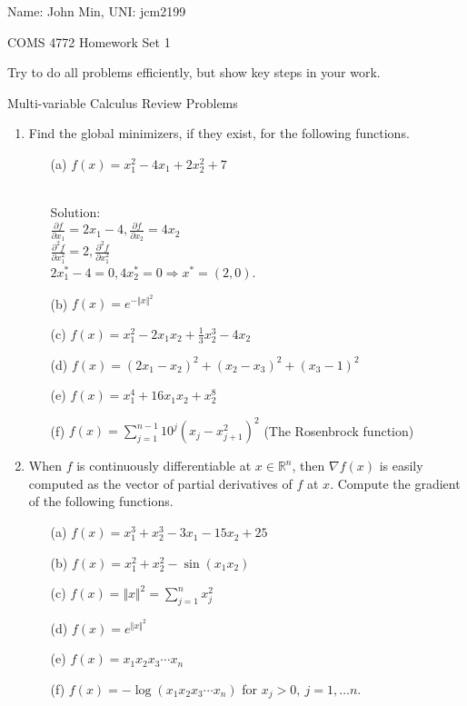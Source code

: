 \documentclass[12pt]{amsart}
\newcommand{\norm}[1]{\Vert #1 \Vert}
\newcommand{\Rn}{\R^n}
\newcommand{\R}{{\mathbb{R}}}
\newcommand{\grad}{\nabla}
\begin{document}
{\Large Name: John Min, \Large UNI: jcm2199}  \\
\begin{center}
\Large COMS 4772 \hskip 2in Homework Set 1
\end{center}
\bigskip


Try to do all problems efficiently, but show key steps in your work. 

\noindent
{\sf Multi-variable Calculus Review Problems}

\begin{enumerate}
\item
Find the global minimizers, if they exist, for the following functions.
\begin{enumerate}
\item[(a)] $f(x)=x_1^2-4x_1+2x_2^2+7$

\noindent \\ 
\noindent
Solution: \\
$\frac{\partial f}{\partial x_1} = 2 x_1 - 4, \frac{\partial f}{\partial x_2} = 4 x_2$ \\
$\frac{\partial^2 f}{\partial x_1^2} = 2, \frac{\partial^2 f}{\partial x_1^2}$ \\
$ 2x_1^* - 4 = 0, 4x_2^* = 0 \Rightarrow x^* = (2,0)$. \\


\item[(b)] $f(x)=e^{-\norm{x}^2}$
\item[(c)] $f(x)=x_1^2-2x_1x_2+\frac{1}{3}x_2^3-4x_2$
\item[(d)] $f(x)=(2x_1-x_2)^2+(x_2-x_3)^2+(x_3-1)^2$
\item[(e)] $f(x)=x_1^4+16x_1x_2+x_2^8$
\item[(f)] $f(x)=\sum_{j=1}^{n-1} 10^j(x_j-x_{j+1}^2)^2$ 
(The Rosenbrock function)
\end{enumerate}

\item When $f$ is continuously differentiable at $x\in\Rn$,
then $\grad f(x)$ is easily computed as the vector of partial derivatives of $f$
at $x$.
Compute the gradient of the following functions.
\begin{enumerate}
\item[(a)] $f(x)=x_1^3+x_2^3-3x_1-15x_2+25 $
\item[(b)] $f(x)=x_1^2+x_2^2-\sin(x_1x_2)$
\item[(c)] $f(x)=\norm{x}^2=\sum_{j=1}^nx_j^2$
\item[(d)] $f(x)=\displaystyle e^{\norm{x}^2}$
\item[(e)] $f(x)=x_1x_2x_3\cdots x_n $ 
\item[(f)] $f(x)=-\log(x_1x_2x_3\cdots x_n)$ for $x_j>0,\ j=1,\dots n$.
\end{enumerate}


\end{enumerate}
\end{document}
